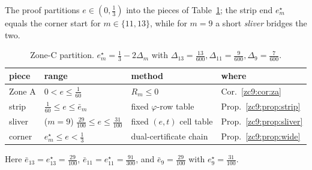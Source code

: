 \documentclass[11pt]{amsart}
\begin{document}
The proof partitions $e\in(0,\tfrac13)$ into the pieces of
Table~\ref{zc9:tab:split}; the strip end $e^\star_m$ equals the corner start for
$m\in\{11,13\}$, while for $m=9$ a short \emph{sliver} bridges the two.
\begin{table}[h]\centering\small
\caption{Zone-C partition.  $e^\star_m=\tfrac13-2\Delta_m$ with
$\Delta_{13}=\tfrac{13}{600},\Delta_{11}=\tfrac9{600},\Delta_9=\tfrac7{600}$.}
\label{zc9:tab:split}
\begin{tabular}{llll}
\toprule
piece & range & method & where\\
\midrule
Zone A & $0<e\le\tfrac1{60}$ & $R_m\le0$ & Cor.~\ref{zc9:cor:za}\\
strip  & $\tfrac1{60}\le e\le \bar e_m$ & fixed $\varphi$-row table & Prop.~\ref{zc9:prop:strip}\\
sliver & ($m=9$) $\tfrac{29}{100}\le e\le\tfrac{31}{100}$ & fixed $(e,t)$ cell table & Prop.~\ref{zc9:prop:sliver}\\
corner & $e^\star_m\le e<\tfrac13$ & dual-certificate chain & Prop.~\ref{zc9:prop:wide}\\
\bottomrule
\end{tabular}
\end{table}
Here $\bar e_{13}=e^\star_{13}=\tfrac{29}{100}$,
$\bar e_{11}=e^\star_{11}=\tfrac{91}{300}$, and
$\bar e_{9}=\tfrac{29}{100}$ with $e^\star_9=\tfrac{31}{100}$.
\end{document}
